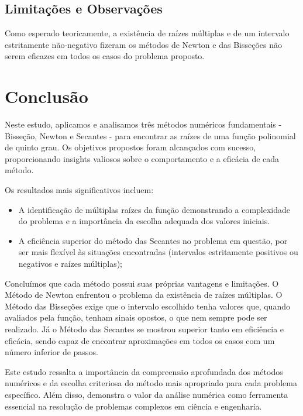 \documentclass{article}
\begin{document}
\subsection{Limita\c{c}\~{o}es e Observa\c{c}\~{o}es}

Como esperado teoricamente, a existência de raízes múltiplas e de um intervalo estritamente não-negativo fizeram os métodos de Newton e das Bisseções não serem eficazes em todos os casos do problema proposto.




\section{Conclusão}
Neste estudo, aplicamos e analisamos três métodos numéricos fundamentais - Bisseção, Newton e Secantes - para encontrar as raízes de uma função polinomial de quinto grau. Os objetivos propostos foram alcançados com sucesso, proporcionando insights valiosos sobre o comportamento e a eficácia de cada método.

Os resultados mais significativos incluem:

\begin{itemize}
    \item A identificação de múltiplas raízes da função demonstrando a complexidade do problema e a importância da escolha adequada dos valores iniciais.
    \item A eficiência superior do método das Secantes no problema em questão, por ser mais flexível às situações encontradas (intervalos estritamente positivos ou negativos e raízes múltiplas);
\end{itemize}

Concluímos que cada método possui suas próprias vantagens e limitações. O Método de Newton enfrentou o problema da existência de raízes múltiplas. O Método das Bisseções exige que o intervalo escolhido tenha valores que, quando avaliados pela função, tenham sinais opostos, o que nem sempre pode ser realizado. Já o Método das Secantes se mostrou superior tanto em eficiência e eficácia, sendo capaz de encontrar aproximações em todos os casos com um número inferior de passos.

Este estudo ressalta a importância da compreensão aprofundada dos métodos numéricos e da escolha criteriosa do método mais apropriado para cada problema específico. Além disso, demonstra o valor da análise numérica como ferramenta essencial na resolução de problemas complexos em ciência e engenharia.
\\ \\
\end{document}

